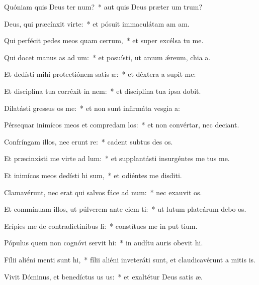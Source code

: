 \item Quóniam quis Deus ter num?~* aut quis Deus præter um trum?
\item Deus, qui præcínxit  virte:~* et pósuit immaculátam am am.
\item Qui perfécit pedes meos quam cerrum,~* et super excélsa tu me.
\item Qui docet manus as ad um:~* et posuísti, ut arcum ǽreum, chia a.
\item Et dedísti mihi protectiónem satis æ:~* et déxtera a supit me:
\item Et disciplína tua corréxit  in nem:~* et disciplína tua ipsa  dobit.
\item Dilatásti gressus os  me:~* et non sunt infirmáta vesgia a:
\item Pérsequar inimícos meos et compredam los:~* et non convértar, nec deciant.
\item Confríngam illos, nec erunt re:~* cadent subtus des os.
\item Et præcinxísti me virte ad lum:~* et supplantásti insurgéntes  me tus me.
\item Et inimícos meos dedísti hi sum,~* et odiéntes me disditi.
\item Clamavérunt, nec erat qui salvos fáce ad num:~* nec exauvit os.
\item Et commínuam illos, ut púlverem ante ciem ti:~* ut lutum plateárum debo os.
\item Erípies me de contradictinibus li:~* constítues me in put tium.
\item Pópulus quem non cognóvi servit hi:~* in audítu auris obevit hi.
\item Fílii aliéni menti sunt hi,~* fílii aliéni inveteráti sunt, et claudicavérunt a mitis is.
\item Vivit Dóminus, et benedíctus us us:~* et exaltétur Deus satis æ.
